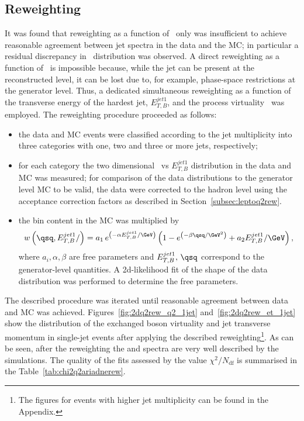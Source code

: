 \subsection{\ariadne Reweighting}
\label{subsec:ariadneq2rew}
It was found that reweighting as a function of \qsq~only was insufficient to achieve reasonable agreement between jet spectra in the data and the \ariadne MC; in particular a residual discrepancy in \etjetb~distribution was observed. A direct reweighting as a function of \etjetb~is impossible because, while the jet can be present at the reconstructed level, it can be lost due to, for example, phase-space restrictions at the generator level. Thus, a dedicated simultaneous reweighting as a function of the transverse energy of the hardest jet, $E_{T,B}^{jet1}$, and the process virtuality \qsq~was employed. The reweighting procedure proceeded as follows:
\begin{itemize}
	\item the data and MC events were classified according to the jet multiplicity into three categories with one, two and three or more jets, respectively;
	\item for each category the two dimensional \qsq~vs $E_{T,B}^{jet1}$ distribution in the data and MC was measured; for comparison of the data distributions to the generator level MC to be valid, the data were corrected to the hadron level using the acceptance correction factors as described in Section~\ref{subsec:leptoq2rew}.
	\item the bin content in the MC was multiplied by 
	\begin{equation}
		w\left( \qsq, E_{T,B}^{jet1}/ \right)=a_1\,e^{\left( -\alpha E_{T,B}^{jet1}/\GeV\right) }\left(1- e^{\left( -\beta\qsq/\GeV^2\right) } + a_2 E_{T,B}^{jet1}/\GeV \right),
		\end{equation}
where $a_i, \alpha, \beta$ are free parameters and $E_{T,B}^{jet1},\,\qsq$ correspond to the generator-level quantities. A 2d-likelihood fit of the shape of the data distribution was performed to determine the free parameters.
\end{itemize}
The described procedure was iterated until reasonable agreement between data and MC was achieved. Figures~\ref{fig:2dq2rew_q2_1jet} and~\ref{fig:2dq2rew_et_1jet} show the distribution of the exchanged boson virtuality and jet transverse momentum in single-jet events after applying the described reweighting\footnote{The figures for events with higher jet multiplicity can be found in the Appendix.}. As can be seen, after the reweighting the \qsq and \etjetb spectra are very well described by the simulations. The quality of the fits assessed by the value  $\chi^2/N_\text{df}$ is summarised in the Table~\ref{tab:chi2q2ariadnerew}.
